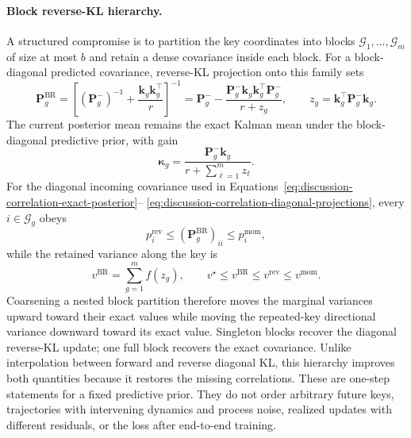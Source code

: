 \documentclass[11pt]{article}
\newcommand{\vct}[1]{\boldsymbol{#1}}
\begin{document}
\paragraph{Block reverse-KL hierarchy.}
A structured compromise is to partition the key coordinates into blocks
$\mathcal{G}_1,\ldots,\mathcal{G}_m$ of size at most $b$ and retain a dense covariance inside
each block. For a block-diagonal predicted covariance, reverse-KL projection onto this family
sets
\begin{equation}
  \vct{P}_g^{\mathrm{BR}}
  =\left[
      (\vct{P}_g^{-})^{-1}
      +\frac{\vct{k}_g\vct{k}_g^\top}{r}
    \right]^{-1}
  =\vct{P}_g^{-}
   -\frac{\vct{P}_g^{-}\vct{k}_g\vct{k}_g^\top\vct{P}_g^{-}}
     {r+z_g},
  \qquad
  z_g=\vct{k}_g^\top\vct{P}_g^{-}\vct{k}_g.
  \label{eq:discussion-block-reverse-kl}
\end{equation}
The current posterior mean remains the exact Kalman mean under the block-diagonal predictive
prior, with gain
\begin{equation}
  \vct{\kappa}_g
  =\frac{\vct{P}_g^{-}\vct{k}_g}
    {r+\sum_{\ell=1}^{m}z_\ell}.
  \label{eq:discussion-block-gain}
\end{equation}
For the diagonal incoming covariance used in
Equations~\eqref{eq:discussion-correlation-exact-posterior}--
\eqref{eq:discussion-correlation-diagonal-projections}, every $i\in\mathcal{G}_g$ obeys
\begin{equation}
  p_i^{\mathrm{rev}}
  \leq (\vct{P}_g^{\mathrm{BR}})_{ii}
  \leq p_i^{\mathrm{mom}},
  \label{eq:discussion-block-marginal-ordering}
\end{equation}
while the retained variance along the key is
\begin{equation}
  v^{\mathrm{BR}}
  =\sum_{g=1}^{m}f(z_g),
  \qquad
  v^{\star}\leq v^{\mathrm{BR}}
  \leq v^{\mathrm{rev}}\leq v^{\mathrm{mom}}.
  \label{eq:discussion-block-directional-ordering}
\end{equation}
Coarsening a nested block partition therefore moves the marginal variances upward toward their
exact values while moving the repeated-key directional variance downward toward its exact value.
Singleton blocks recover the diagonal reverse-KL update; one full block recovers the exact
covariance. Unlike interpolation between forward and reverse diagonal KL, this hierarchy improves
both quantities because it restores the missing correlations. These are one-step statements for a
fixed predictive prior. They do not order arbitrary future keys, trajectories with intervening
dynamics and process noise, realized updates with different residuals, or the loss after end-to-end
training.
\end{document}
